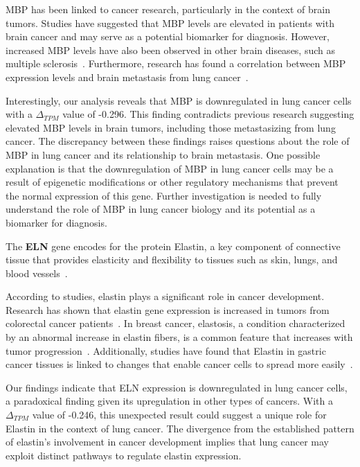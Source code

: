 MBP has been linked to cancer research, particularly in the context of brain tumors.
Studies have suggested that MBP levels are elevated in patients with brain cancer and may serve as a potential biomarker for diagnosis.
However, increased MBP levels have also been observed in other brain diseases, such as multiple sclerosis~\cite{Zavialova2017MBP}.
Furthermore, research has found a correlation between MBP expression levels and brain metastasis from lung cancer~\cite{Nakagawa1994MBP}.

Interestingly, our analysis reveals that MBP is downregulated in lung cancer cells with a $\Delta_{TPM}$ value of -0.296.
This finding contradicts previous research suggesting elevated MBP levels in brain tumors,
including those metastasizing from lung cancer.
The discrepancy between these findings raises questions about the role of MBP in lung cancer and its relationship to brain metastasis.
One possible explanation is that the downregulation of MBP in lung cancer cells may be a result of epigenetic modifications
or other regulatory mechanisms that prevent the normal expression of this gene.
Further investigation is needed to fully understand the role of MBP in lung cancer biology and its potential as a biomarker for diagnosis.
\newline

The \textbf{ELN} gene encodes for the protein Elastin,
a key component of connective tissue that provides elasticity and
flexibility to tissues such as skin, lungs, and blood vessels~\cite{Debelle1999ELN}.

According to studies, elastin plays a significant role in cancer development.
Research has shown that elastin gene expression is increased in tumors from colorectal cancer patients~\cite{Li2020ELN}.
In breast cancer, elastosis, a condition characterized by an abnormal increase in elastin fibers,
is a common feature that increases with tumor progression~\cite{Lepucki2022ELN}.
Additionally, studies have found that Elastin in gastric cancer tissues is linked to changes that enable cancer cells
to spread more easily~\cite{Fang2023ELN}.

Our findings indicate that ELN expression is downregulated in lung cancer cells,
a paradoxical finding given its upregulation in other types of cancers.
With a $\Delta_{TPM}$ value of -0.246, this unexpected result could suggest a unique role for Elastin in the context of lung cancer.
The divergence from the established pattern of elastin's involvement in cancer development implies
that lung cancer may exploit distinct pathways to regulate elastin expression.
\newline

